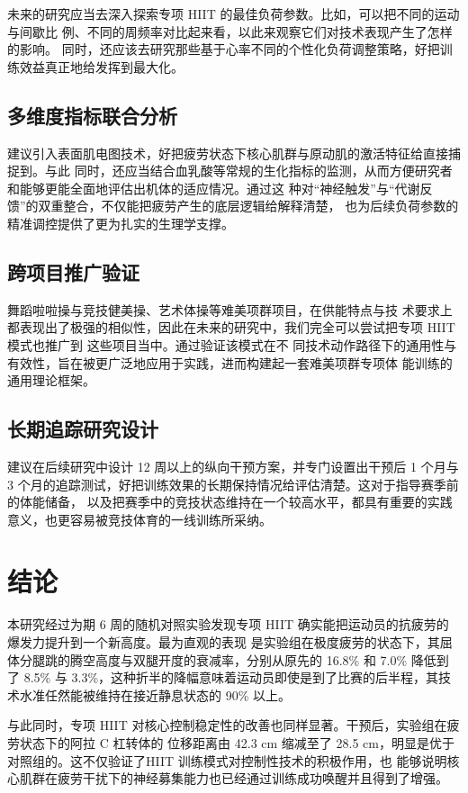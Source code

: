 \documentclass[a4paper,12pt]{article}
\begin{document}
未来的研究应当去深入探索专项 HIIT 的最佳负荷参数。比如，可以把不同的运动与间歇比
例、不同的周频率对比起来看，以此来观察它们对技术表现产生了怎样的影响。
同时，还应该去研究那些基于心率不同的个性化负荷调整策略，好把训练效益真正地给发挥到最大化。

\subsection{多维度指标联合分析}
建议引入表面肌电图技术，好把疲劳状态下核心肌群与原动肌的激活特征给直接捕捉到。与此
同时，还应当结合血乳酸等常规的生化指标的监测，从而方便研究者和能够更能全面地评估出机体的适应情况。通过这
种对“神经触发”与“代谢反馈”的双重整合，不仅能把疲劳产生的底层逻辑给解释清楚，
也为后续负荷参数的精准调控提供了更为扎实的生理学支撑。
\subsection{跨项目推广验证}
舞蹈啦啦操与竞技健美操、艺术体操等难美项群项目，在供能特点与技
术要求上都表现出了极强的相似性，因此在未来的研究中，我们完全可以尝试把专项 HIIT 模式也推广到
这些项目当中。通过验证该模式在不
同技术动作路径下的通用性与有效性，旨在被更广泛地应用于实践，进而构建起一套难美项群专项体
能训练的通用理论框架。

\subsection{长期追踪研究设计}

建议在后续研究中设计 12 周以上的纵向干预方案，并专门设置出干预后 1 个月与 3
个月的追踪测试，好把训练效果的长期保持情况给评估清楚。这对于指导赛季前的体能储备，
以及把赛季中的竞技状态维持在一个较高水平，都具有重要的实践意义，也更容易被竞技体育的一线训练所采纳。

\section{结论}
本研究经过为期 6 周的随机对照实验发现专项 HIIT 确实能把运动员的抗疲劳的爆发力提升到一个新高度。最为直观的表现
是实验组在极度疲劳的状态下，其屈体分腿跳的腾空高度与双腿开度的衰减率，分别从原先的 16.8\% 和 7.0\% 降低到了
8.5\% 与 3.3\%，这种折半的降幅意味着运动员即使是到了比赛的后半程，其技术水准任然能被维持在接近静息状态的 90\% 以上。

与此同时，专项 HIIT 对核心控制稳定性的改善也同样显著。干预后，实验组在疲劳状态下的阿拉 C 杠转体的
位移距离由 42.3 cm 缩减至了 28.5 cm，明显是优于对照组的。这不仅验证了HIIT 训练模式对控制性技术的积极作用，也
能够说明核心肌群在疲劳干扰下的神经募集能力也已经通过训练成功唤醒并且得到了增强。
\end{document}
